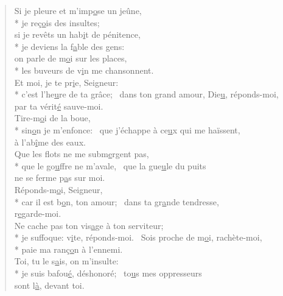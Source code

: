 \begin{verse}
Si je pleure et m’imp\underline{o}se un jeûne, \\*
je reç\underline{o}is des insultes; \\
si je revêts un hab\underline{i}t de pénitence, \\*
je deviens la f\underline{a}ble des gens: \\
on parle de m\underline{o}i sur les places, \\*
les buveurs de v\underline{i}n me chansonnent. \\

Et moi, je te pr\underline{i}e, Seigneur: \\*
c’est l’he\underline{u}re de ta grâce;~\psalmstar
dans ton grand amour, Die\underline{u}, réponds-moi, \\
par ta vérit\underline{é} sauve-moi. \\

Tire-m\underline{o}i de la boue, \\*
sin\underline{o}n je m’enfonce:~\psalmstar
que j’échappe à ce\underline{u}x qui me haïssent, \\
à l’ab\underline{î}me des eaux. \\

Que les flots ne me subm\underline{e}rgent pas, \\*
que le go\underline{u}ffre ne m’avale,~\psalmstar
que la gue\underline{u}le du puits \\
ne se ferme p\underline{a}s sur moi. \\

Réponds-m\underline{o}i, Seigneur, \\*
car il est b\underline{o}n, ton amour;~\psalmstar
dans ta gr\underline{a}nde tendresse, \\
r\underline{e}garde-moi. \\

Ne cache pas ton vis\underline{a}ge à ton serviteur; \\*
je suffoque: v\underline{i}te, réponds-moi.~\psalmstar
{}Sois proche de m\underline{o}i, rachète-moi, \\*
paie ma ranç\underline{o}n à l’ennemi. \\

Toi, tu le s\underline{a}is, on m’insulte: \\*
je suis bafou\underline{é}, déshonoré;~\psalmstar
to\underline{u}s mes oppresseurs \\
sont l\underline{à}, devant toi. \\


\end{verse}

